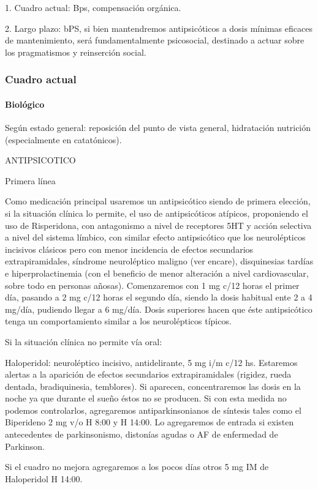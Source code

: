 1. Cuadro actual: Bps, compensación orgánica.

2. Largo plazo: bPS, si bien mantendremos antipsicóticos a dosis mínimas eficaces de mantenimiento, será fundamentalmente psicosocial, destinado a actuar sobre los pragmatismos y reinserción social.
\subsubsection*{Cuadro actual}
\paragraph*{Biológico}
Según estado general: reposición del punto de vista general, hidratación nutrición (especialmente en catatónicos).

ANTIPSICOTICO

Primera línea

Como medicación principal usaremos un antipsicótico siendo de primera elección, si la situación clínica lo permite, el uso de antipsicóticos atípicos, proponiendo el uso de Risperidona, con antagonismo a nivel de receptores 5HT y acción selectiva a nivel del sistema límbico, con similar efecto antipsicótico que los neurolépticos incisivos clásicos pero con menor incidencia de efectos secundarios extrapiramidales, síndrome neuroléptico maligno (ver encare), disquinesias tardías e hiperprolactinemia (con el beneficio de menor alteración a nivel cardiovascular, sobre todo en personas añosas). Comenzaremos con 1 mg c/12 horas el primer día, pasando a 2 mg c/12 horas el segundo día, siendo la dosis habitual ente 2 a 4 mg/día, pudiendo llegar a 6 mg/día. Dosis superiores hacen que éste antipsicótico tenga un comportamiento similar a los neurolépticos típicos.

Si la situación clínica no permite vía oral:

Haloperidol: neuroléptico incisivo, antidelirante, 5 mg i/m c/12 hs. Estaremos alertas a la aparición de efectos secundarios extrapiramidales (rigidez, rueda dentada, bradiquinesia, temblores). Si aparecen, concentraremos las dosis en la noche ya que durante el sueño éstos no se producen. Si con esta medida no podemos controlarlos, agregaremos antiparkinsonianos de síntesis tales como el Biperideno 2 mg v/o H 8:00 y H 14:00. Lo agregaremos de entrada si existen antecedentes de parkinsonismo, distonías agudas o AF de enfermedad de Parkinson.

Si el cuadro no mejora agregaremos a los pocos días otros 5 mg IM de Haloperidol H 14:00.

